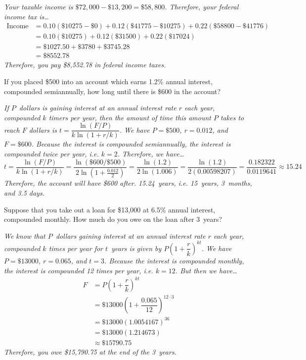 \documentclass[12pt,letterpaper]{exam}
\begin{document}
\begin{questions}
{\itshape 
\sol Your taxable income is $\$72,000 - \$13,200= \$58,800$. Therefore, your federal income tax is\dots
	\[
	\begin{aligned}
	\text{Income Tax}&= 0.10(\$10275 - \$0) + 0.12(\$41775 - \$10275) + 0.22(\$58800 - \$41776) \\[0.3cm]
	&= 0.10(\$10275) + 0.12(\$31500) + 0.22(\$17024) \\[0.3cm]
	&= \$1027.50 + \$3780 + \$3745.28 \\[0.3cm]
	&= \$8552.78
	\end{aligned}
	\]
Therefore, you pay \$8,552.78 in federal income taxes. 
}



\newpage
\question[10] If you placed \$500 into an account which earns 1.2\% annual interest, compounded semiannually, how long until there is \$600 in the account? \pspace

{\itshape
\sol If $P$~dollars is gaining interest at an annual interest rate $r$ each year, compounded $k$ timers per year, then the amount of time this amount $P$ takes to reach $F$ dollars is $t= \dfrac{\ln(F/P)}{k \ln(1 + r/k)}$. We have $P= \$500$, $r= 0.012$, and $F= \$600$. Because the interest is compounded semiannually, the interest is compounded twice per year, i.e. $k= 2$. Therefore, we have\dots
	\[
	t= \dfrac{\ln(F/P)}{k \ln(1 + r/k)}= \dfrac{\ln(\$600/\$500)}{2 \ln \left(1 + \frac{0.012}{2} \right)}= \dfrac{\ln(1.2)}{2 \ln(1.006)}= \dfrac{\ln(1.2)}{2(0.00598207)}= \dfrac{0.182322}{0.0119641} \approx 15.24
	\]
Therefore, the account will have \$600 after. 15.24~years, i.e. 15~years, 3~months, and 3.5 days. 
}



\newpage
\question[10] Suppose that you take out a loan for \$13,000 at 6.5\% annual interest, compounded monthly. How much do you owe on the loan after 3~years? \pspace

{\itshape
\sol We know that $P$~dollars gaining interest at an annual interest rate $r$ each year, compounded $k$ times per year for $t$~years is given by $P \left(1 + \dfrac{r}{k} \right)^{kt}$. We have $P= \$13000$, $r= 0.065$, and $t= 3$. Because the interest is compounded monthly, the interest is compounded 12 times per year, i.e. $k= 12$. But then we have\dots
	\[
	\begin{aligned}
	F&= P \left(1 + \dfrac{r}{k} \right)^{kt} \\[0.3cm]
	&= \$13000 \left(1 + \dfrac{0.065}{12} \right)^{12 \cdot 3} \\[0.3cm]
	&= \$13000 (1.0054167)^{36} \\[0.3cm]
	&= \$13000 (1.214673) \\[0.3cm]
	&\approx \$15790.75
	\end{aligned}
	\]
Therefore, you owe \$15,790.75 at the end of the 3~years. 
}




\end{questions}
\end{document}
